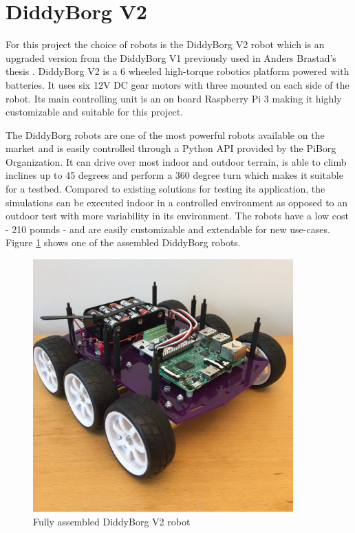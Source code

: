 \section{DiddyBorg V2}
For this project the choice of robots is the DiddyBorg V2 robot which is an upgraded version from the DiddyBorg V1 previously used in Anders Brastad's thesis \cite{DevelopmentOfVTL}. DiddyBorg V2 is a 6 wheeled high-torque robotics platform powered with batteries. It uses six 12V DC gear motors with three mounted on each side of the robot. Its main controlling unit is an on board Raspberry Pi 3 making it highly customizable and suitable for this project. 

\noindent The DiddyBorg robots are one of the most powerful robots available on the market and is easily controlled through a Python API provided by the PiBorg Organization. It can drive over most indoor and outdoor terrain, is able to climb inclines up to 45 degrees and perform a 360 degree turn which makes it suitable for a testbed. Compared to existing solutions for testing \gls{its} application, the simulations can be executed indoor in a controlled environment as opposed to an outdoor test with more variability in its environment. The robots have a low cost - 210 pounds - and are easily customizable and extendable for new use-cases. Figure \ref{fig:diddyborg-robot} shows one of the assembled DiddyBorg robots. 

\begin{figure}[H]
\centering
\includegraphics[width=10cm]{images/DiddyBorgV2.jpg}
\caption{Fully assembled DiddyBorg V2 robot}
\label{fig:diddyborg-robot}
\end{figure}

